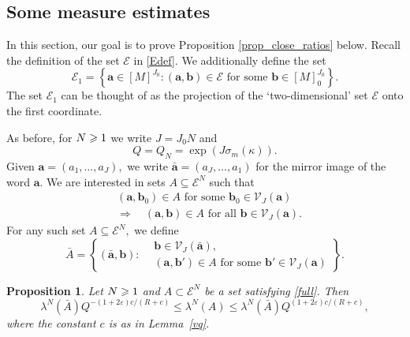\documentclass[12pt, reqno]{amsart}
\newtheorem{prop}[thm]{Proposition}
\theoremstyle{definition}
\theoremstyle{remark}
\numberwithin{equation}{section}
\def\kap{{\kappa}}
\def\lam{{\lambda}} \def\Lam{{\Lambda}} \def\Lamtil{{\widetilde \Lambda}}
\def\sig{{\sigma}} \def\Sig{{\Sigma}} \def\bfsig{{\boldsymbol \sig}}
\def\leq{\leqslant}
\def \sig{{\sigma}}
\def \ba {\mathbf a}
\def \bb {\mathbf b}
\def \cE {\mathcal E}
\def \cV {\mathcal V}
\begin{document}
\subsection{Some measure estimates}

In this section, our goal is to prove Proposition \ref{prop_close_ratios} below. Recall the definition of the set $\cE$ in \eqref{Edef}. We additionally define the set
\[
\cE_1 =\left\{\ba\in [M]^{J_0} :  (\ba,\bb)\in \cE  \text{ for some }\bb\in [M]_{0}^{J_0} \right\}.
\]
The set $\cE_1$ can be thought of as the projection of the `two-dimensional' set $\cE$ onto the first coordinate. 

As before, for $N\geqslant 1$ we write $J=J_0 N$ and 
\[
Q = Q_N = \exp(J\sig_m(\kap)).
\]
Given $\ba = (a_1, \ldots, a_{J}),$ we write $\bar{\ba} = (a_{J}, \ldots, a_1)$ for the mirror image of the word $\ba$. We are interested in sets $A\subseteq \cE^N$ such that \begin{equation} \label{full}
\begin{aligned}
&(\ba, \bb_0) \in A \text{ for some } \bb_0\in \cV_{J}(\ba) \\
&\Rightarrow \quad (\ba, \bb) \in A \text{ for all }  
\bb \in \cV_{J}(\ba).
\end{aligned}
\end{equation}
For any such set $A\subseteq \cE^N,$ we define 
\begin{equation} 
\label{mirror_set} 
\bar{A} = \left\{ (\bar{\ba},\bb): 
\begin{aligned}
&\bb\in \cV_{J}(\bar{\ba}), \\
&(\ba,\bb')\in A \text{ for some } \bb' \in \cV_{J}(\ba)
\end{aligned}
\right\}. 
\end{equation} 

\begin{prop} \label{prop_almost_invariance}
Let $N\geqslant 1$ and $A\subset\cE^N$ be a set satisfying \eqref{full}. Then 
\[  
\lam^N(\bar{A})
Q^{-(1+2\varepsilon)c/(R+c)}\leq \lam^N(A)
\leq \lam^N(\bar{A})
Q^{(1+2\varepsilon)
c/(R+c)}, 
\]
where the constant $c$ is as in Lemma~\ref{vq}.
\end{prop}
\end{document}
